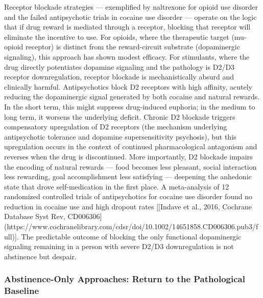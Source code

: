 Receptor blockade strategies --- exemplified by naltrexone for opioid use disorder and the failed antipsychotic trials in cocaine use disorder --- operate on the logic that if drug reward is mediated through a receptor, blocking that receptor will eliminate the incentive to use. For opioids, where the therapeutic target (mu-opioid receptor) is distinct from the reward-circuit substrate (dopaminergic signaling), this approach has shown modest efficacy. For stimulants, where the drug directly potentiates dopamine signaling and the pathology is D2/D3 receptor downregulation, receptor blockade is mechanistically absurd and clinically harmful. Antipsychotics block D2 receptors with high affinity, acutely reducing the dopaminergic signal generated by both cocaine and natural rewards. In the short term, this might suppress drug-induced euphoria; in the medium to long term, it worsens the underlying deficit. Chronic D2 blockade triggers compensatory upregulation of D2 receptors (the mechanism underlying antipsychotic tolerance and dopamine supersensitivity psychosis), but this upregulation occurs in the context of continued pharmacological antagonism and reverses when the drug is discontinued. More importantly, D2 blockade impairs the encoding of natural rewards --- food becomes less pleasant, social interaction less rewarding, goal accomplishment less satisfying --- deepening the anhedonic state that drove self-medication in the first place. A meta-analysis of 12 randomized controlled trials of antipsychotics for cocaine use disorder found no reduction in cocaine use and high dropout rates {[}{[}Indave et al., 2016, Cochrane Database Syst Rev, CD006306{]} (https://www.cochranelibrary.com/cdsr/doi/10.1002/14651858.CD006306.pub3/full){]}. The predictable outcome of blocking the only functional dopaminergic signaling remaining in a person with severe D2/D3 downregulation is not abstinence but despair.

\subsubsection{Abstinence-Only Approaches: Return to the Pathological Baseline}\label{18_restoration-abstinence-only-approaches-return-to-the-pathological-baseline}

